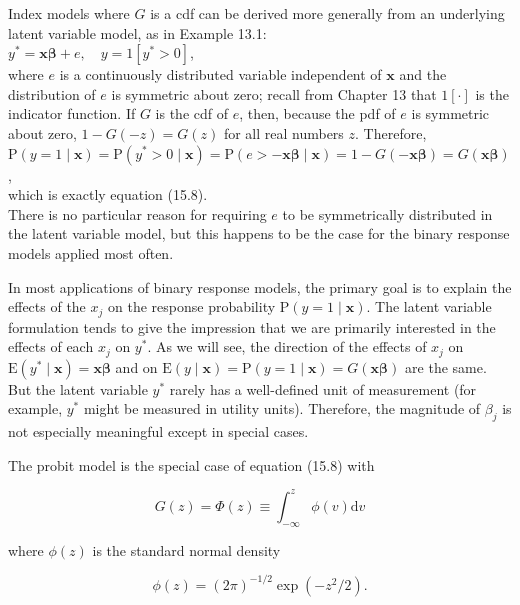 \documentclass[10pt]{article}
\begin{document}
Index models where $G$ is a cdf can be derived more generally from an underlying latent variable model, as in Example 13.1:\\
$y^{*}=\mathbf{x} \boldsymbol{\beta}+e, \quad y=1\left[y^{*}>0\right]$,\\
where $e$ is a continuously distributed variable independent of $\mathbf{x}$ and the distribution of $e$ is symmetric about zero; recall from Chapter 13 that $1[\cdot]$ is the indicator function. If $G$ is the cdf of $e$, then, because the pdf of $e$ is symmetric about zero, $1-G(-z)= G(z)$ for all real numbers $z$. Therefore,\\
$\mathrm{P}(y=1 \mid \mathbf{x})=\mathrm{P}\left(y^{*}>0 \mid \mathbf{x}\right)=\mathrm{P}(e>-\mathbf{x} \boldsymbol{\beta} \mid \mathbf{x})=1-G(-\mathbf{x} \boldsymbol{\beta})=G(\mathbf{x} \boldsymbol{\beta})$,\\
which is exactly equation (15.8).\\
There is no particular reason for requiring $e$ to be symmetrically distributed in the latent variable model, but this happens to be the case for the binary response models applied most often.

In most applications of binary response models, the primary goal is to explain the effects of the $x_{j}$ on the response probability $\mathrm{P}(y=1 \mid \mathbf{x})$. The latent variable formulation tends to give the impression that we are primarily interested in the effects of each $x_{j}$ on $y^{*}$. As we will see, the direction of the effects of $x_{j}$ on $\mathrm{E}\left(y^{*} \mid \mathbf{x}\right)=\mathbf{x} \boldsymbol{\beta}$ and on $\mathrm{E}(y \mid \mathbf{x})=\mathrm{P}(y=1 \mid \mathbf{x})=G(\mathbf{x} \boldsymbol{\beta})$ are the same. But the latent variable $y^{*}$ rarely has a well-defined unit of measurement (for example, $y^{*}$ might be measured in utility units). Therefore, the magnitude of $\beta_{j}$ is not especially meaningful except in special cases.

The probit model is the special case of equation (15.8) with


\begin{equation*}
G(z)=\Phi(z) \equiv \int_{-\infty}^{z} \phi(v) \mathrm{d} v \tag{15.10}
\end{equation*}


where $\phi(z)$ is the standard normal density


\begin{equation*}
\phi(z)=(2 \pi)^{-1 / 2} \exp \left(-z^{2} / 2\right) . \tag{15.11}
\end{equation*}
\end{document}
